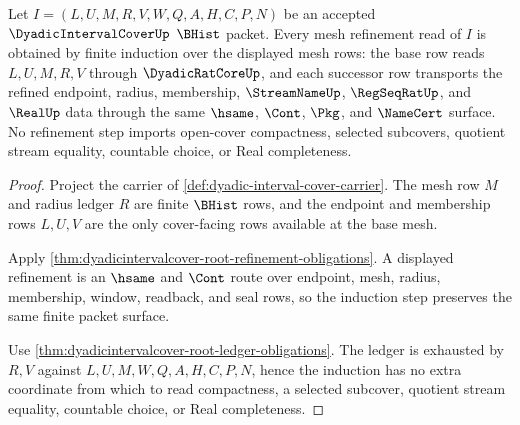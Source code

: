 \begin{theorem}
\label{thm:dyadic-interval-cover-mesh-refinement-induction}
Let $I=(L,U,M,R,V,W,Q,A,H,C,P,N)$ be an accepted $\DyadicIntervalCoverUp$ $\BHist$ packet. Every mesh refinement read of $I$ is obtained by finite induction over the displayed mesh rows: the base row reads $L,U,M,R,V$ through $\DyadicRatCoreUp$, and each successor row transports the refined endpoint, radius, membership, $\StreamNameUp$, $\RegSeqRatUp$, and $\RealUp$ data through the same $\hsame$, $\Cont$, $\Pkg$, and $\NameCert$ surface. No refinement step imports open-cover compactness, selected subcovers, quotient stream equality, countable choice, or Real completeness.
\end{theorem}
\begin{proof}
Project the carrier of \autoref{def:dyadic-interval-cover-carrier}. The mesh row $M$ and radius ledger $R$ are finite $\BHist$ rows, and the endpoint and membership rows $L,U,V$ are the only cover-facing rows available at the base mesh.

Apply \autoref{thm:dyadicintervalcover-root-refinement-obligations}. A displayed refinement is an $\hsame$ and $\Cont$ route over endpoint, mesh, radius, membership, window, readback, and seal rows, so the induction step preserves the same finite packet surface.

Use \autoref{thm:dyadicintervalcover-root-ledger-obligations}. The ledger is exhausted by $R,V$ against $L,U,M,W,Q,A,H,C,P,N$, hence the induction has no extra coordinate from which to read compactness, a selected subcover, quotient stream equality, countable choice, or Real completeness.
\end{proof}


